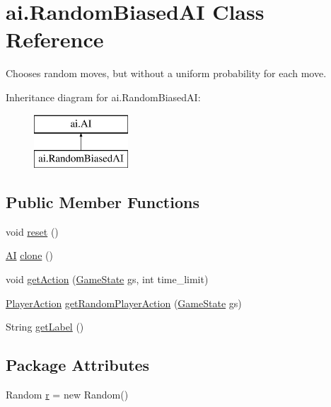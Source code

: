 \hypertarget{classai_1_1_random_biased_a_i}{
\section{ai.RandomBiasedAI Class Reference}
\label{classai_1_1_random_biased_a_i}
}


Chooses random moves, but without a uniform probability for each move.  


Inheritance diagram for ai.RandomBiasedAI:\begin{figure}[H]
\begin{center}
\leavevmode
\includegraphics[height=2.000000cm]{classai_1_1_random_biased_a_i}
\end{center}
\end{figure}
\subsection*{Public Member Functions}
\begin{DoxyCompactItemize}
\item 
void \hyperlink{classai_1_1_random_biased_a_i_a4553531199f936ca415a2c19f801c38c}{reset} ()
\item 
\hyperlink{classai_1_1_a_i}{AI} \hyperlink{classai_1_1_random_biased_a_i_a619555758fc224984604151f2e5961f9}{clone} ()
\item 
void \hyperlink{classai_1_1_random_biased_a_i_a771d9ce5f142c325fcc7bd5a2e4a3215}{getAction} (\hyperlink{classrts_1_1_game_state}{GameState} gs, int time\_\-limit)
\item 
\hyperlink{classai_1_1util_1_1_player_action}{PlayerAction} \hyperlink{classai_1_1_random_biased_a_i_aadf1aee4410f62242f6c0f95dd0f5aa4}{getRandomPlayerAction} (\hyperlink{classrts_1_1_game_state}{GameState} gs)
\item 
String \hyperlink{classai_1_1_random_biased_a_i_ae155794223a516cfcc47f1933059d4f6}{getLabel} ()
\end{DoxyCompactItemize}
\subsection*{Package Attributes}
\begin{DoxyCompactItemize}
\item 
Random \hyperlink{classai_1_1_random_biased_a_i_ad0b6ab7aa1e7a359f6944ce85478dcc0}{r} = new Random()
\end{DoxyCompactItemize}



